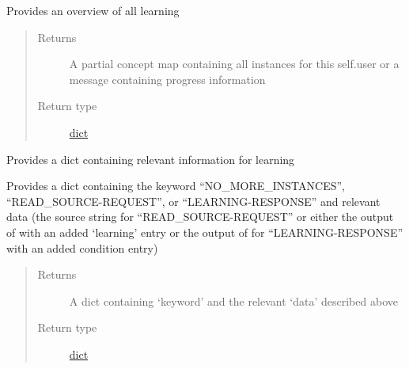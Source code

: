 \documentclass[letterpaper,10pt,english]{sphinxmanual}
\begin{document}
\begin{fulllineitems}
\begin{fulllineitems}
\label{\detokenize{consumer:consumer.Consumer.provide_learned_items}}
Provides an overview of all learning
\begin{quote}\begin{description}
\item[{Returns}] \leavevmode
A partial concept map containing all instances for this self.user or a message containing progress information

\item[{Return type}] \leavevmode
\href{https://docs.python.org/2/library/stdtypes.html\#dict}{dict}

\end{description}\end{quote}

\end{fulllineitems}


\begin{fulllineitems}
\label{\detokenize{consumer:consumer.Consumer.provide_learning}}
Provides a dict containing relevant information for learning

Provides a dict containing the keyword ``NO\_MORE\_INSTANCES'', ``READ\_SOURCE-REQUEST'', or ``LEARNING-RESPONSE'' and relevant data (the source string for ``READ\_SOURCE-REQUEST'' or either the output of  with an added `learning' entry or the output of  for ``LEARNING-RESPONSE'' with an added condition entry)
\begin{quote}\begin{description}
\item[{Returns}] \leavevmode
A dict containing `keyword' and the relevant `data' described above

\item[{Return type}] \leavevmode
\href{https://docs.python.org/2/library/stdtypes.html\#dict}{dict}

\end{description}\end{quote}

\end{fulllineitems}



\end{fulllineitems}
\end{document}

